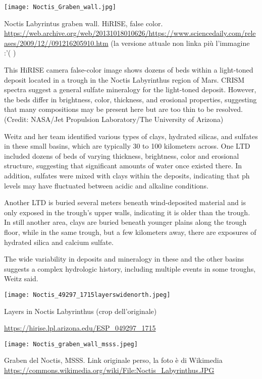 \documentclass[a4paper,10pt,openany,oneside]{memoir}
\begin{document}
\texttt{[image: Noctis\_Graben\_wall.jpg]}

Noctis Labyrintus graben wall. HiRISE, false color. \url{https://web.archive.org/web/20131018010626/https://www.sciencedaily.com/releases/2009/12//091216205910.htm} (la versione attuale non linka più l'immagine :'( )

This HiRISE camera false-color image shows dozens of beds within a light-toned deposit located in a trough in the Noctis Labyrinthus region of Mars. CRISM spectra suggest a general sulfate mineralogy for the light-toned deposit. However, the beds differ in brightness, color, thickness, and erosional properties, suggesting that many compositions may be present here but are too thin to be resolved. (Credit: NASA/Jet Propulsion Laboratory/The University of Arizona)

Weitz and her team identified various types of clays, hydrated silicas, and sulfates in these small basins, which are typically 30 to 100 kilometers across. One LTD included dozens of beds of varying thickness, brightness, color and erosional structure, suggesting that significant amounts of water once existed there. In addition, sulfates were mixed with clays within the deposits, indicating that ph levels may have fluctuated between acidic and alkaline conditions.

Another LTD is buried several meters beneath wind-deposited material and is only exposed in the trough's upper walls, indicating it is older than the trough. In still another area, clays are buried beneath younger plains along the trough floor, while in the same trough, but a few kilometers away, there are exposures of hydrated silica and calcium sulfate.

The wide variability in deposits and mineralogy in these and the other basins suggests a complex hydrologic history, including multiple events in some troughs, Weitz said.



\texttt{[image: Noctis\_49297\_1715layerswidenorth.jpeg]}

Layers in Noctis Labyrinthus (crop dell'originale)

\url{https://hirise.lpl.arizona.edu/ESP_049297_1715}



\texttt{[image: Noctis\_graben\_wall\_msss.jpeg]}

Graben del Noctis, MSSS. Link originale perso, la foto è di Wikimedia \url{https://commons.wikimedia.org/wiki/File:Noctis_Labyrinthus.JPG}
\end{document}
